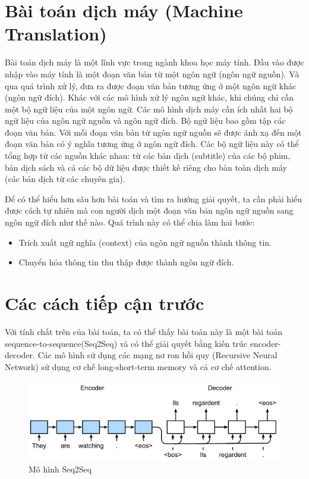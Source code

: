 \section{Bài toán dịch máy (Machine Translation)}

Bài toán dịch máy là một lĩnh vực trong ngành khoa học máy tính. Đầu vào được nhập vào máy tính là một đoạn văn bản từ một ngôn ngữ (ngôn ngữ nguồn). Và qua quá trình xử lý, đưa ra được đoạn văn bản tương ứng ở một ngôn ngữ khác (ngôn ngữ đích). Khác với các mô hình xử lý ngôn ngữ khác, khi chúng chỉ cần một bộ ngữ liệu của một ngôn ngữ. Các mô hình dịch máy cần ích nhất hai bộ ngữ liệu của ngôn ngữ nguồn và ngôn ngữ đích. Bộ ngữ liệu bao gồm tập các đoạn văn bản. Với mỗi đoạn văn bản từ ngôn ngữ nguồn sẽ được ánh xạ đến một đoạn văn bản có ý nghĩa tương ứng ở ngôn ngữ đích. Các bộ ngữ liệu này có thể tổng hợp từ các nguồn khác nhau: từ các bản dịch (subtitle) của các bộ phim, bản dịch sách và cả các bộ dữ liệu được thiết kế riêng cho bàn toàn dịch máy (các bản dịch từ các chuyên gia).

Để có thể hiểu hơn sâu hơn bài toán và tìm ra hướng giải quyết, ta cần phải hiểu được cách tự nhiên mà con người dịch một đoạn văn bản ngôn ngữ nguồn sang ngôn ngữ đích như thế nào. Quá trình này có thể chia làm hai bước:
\begin{itemize}
	\item Trích xuất ngữ nghĩa (context) của ngôn ngữ nguồn thành thông tin.
	\item Chuyển hóa thông tin thu thập được thành ngôn ngữ đích.
\end{itemize}

\section{Các cách tiếp cận trước}

Với tính chất trên của bài toán, ta có thể thấy bài toán này là một bài toán sequence-to-sequence(Seq2Seq) và có thể giải quyết bằng kiến trúc encoder-decoder. Các mô hình sử dụng các mạng nơ ron hồi quy (Recursive Neural Network) sử dụng cơ chế long-short-term memory và cả cơ chế attention.

\begin{figure}[H]
    \begin{center}
        \includegraphics[scale=0.8]{images/seq2seq}
        \caption{Mô hình Seq2Seq}
        \label{fig:seq2seq}
    \end{center}
\end{figure}


